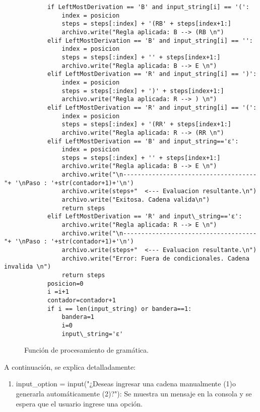 \begin{enumerate}
\begin{lstlisting}
            if LeftMostDerivation == 'B' and input_string[i] == '(':
                index = posicion
                steps = steps[:index] + '(RB' + steps[index+1:]  
                archivo.write("Regla aplicada: B --> (RB \n")
            elif LeftMostDerivation == 'B' and input_string[i] == '':
                index = posicion
                steps = steps[:index] + '' + steps[index+1:]  
                archivo.write("Regla aplicada: B --> E \n")
            elif LeftMostDerivation == 'R' and input_string[i] == ')':
                index = posicion
                steps = steps[:index] + ')' + steps[index+1:]  
                archivo.write("Regla aplicada: R --> ) \n")
            elif LeftMostDerivation == 'R' and input_string[i] == '(':
                index = posicion
                steps = steps[:index] + '(RR' + steps[index+1:]  
                archivo.write("Regla aplicada: R --> (RR \n")
            elif LeftMostDerivation == 'B' and input_string=='ε':
                index = posicion
                steps = steps[:index] + '' + steps[index+1:]
                archivo.write("Regla aplicada: B --> E \n")
                archivo.write("\n-------------------------------------"+ '\nPaso : '+str(contador+1)+'\n')
                archivo.write(steps+"  <--- Evaluacion resultante.\n")
                archivo.write("Exitosa. Cadena valida\n")
                return steps
            elif LeftMostDerivation == 'R' and input\_string=='ε':
                archivo.write("Regla aplicada: R --> E \n")
                archivo.write("\n-------------------------------------"+ '\nPaso : '+str(contador+1)+'\n')
                archivo.write(steps+"  <--- Evaluacion resultante.\n")
                archivo.write("Error: Fuera de condicionales. Cadena invalida \n")
                return steps
            posicion=0 
            i =i+1
            contador=contador+1
            if i == len(input_string) or bandera==1:
                bandera=1
                i=0
                input\_string='ε'
\end{lstlisting}
\begin{figure}[h]
\begin{center}
\end{center}
\caption{Función de procesamiento de gramática.}
\label{fig:imagen}
\end{figure}
\newpage

A continuación, se explica detalladamente:\newline
\begin{enumerate}
    \item input\_option = input("¿Deseas ingresar una cadena manualmente (1)\n o generarla automáticamente (2)?\n "): Se muestra un mensaje en la consola y se espera que el usuario ingrese una opción.\newline


\end{enumerate}
\end{enumerate}

